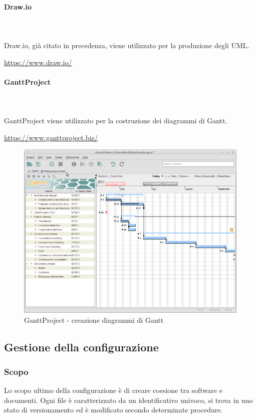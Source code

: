 		\paragraph{Draw.io} \mbox{}\\ \mbox{}\\
		Draw.io, già citato in precedenza, viene utilizzato per la produzione degli UML\glo. \newline
		\centerline{\url{https://www.draw.io/}}
		
		\paragraph{GanttProject} \mbox{}\\ \mbox{}\\
		GanttProject viene utilizzato per la costruzione dei diagrammi				di Gantt\glo. \newline
		\centerline{\url{https://www.ganttproject.biz/}}
		\begin{figure}[H]
			\includegraphics[width=0.99\linewidth]{res/images/ganttproj.png}
			\caption{GanttProject - creazione diagrammi di Gantt}
		\end{figure} 
		
	\subsection{Gestione della configurazione}
	\subsubsection{Scopo}
	Lo scopo ultimo della configurazione è di creare coesione tra software e documenti. Ogni file è caratterizzato da un identificativo univoco, si trova in uno stato di versionamento ed è modificato secondo determinate procedure.
